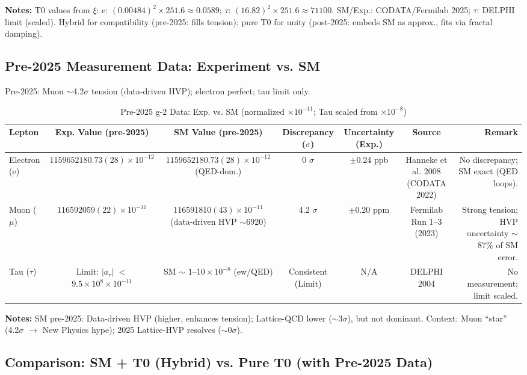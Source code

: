 \documentclass[12pt,a4paper]{article}
\begin{document}
	\textbf{Notes:} T0 values from $\xi$: e: $(0.00484)^2 \times 251.6 \approx 0.0589$; $\tau$: $(16.82)^2 \times 251.6 \approx 71100$. SM/Exp.: CODATA/Fermilab 2025; $\tau$: DELPHI limit (scaled). Hybrid for compatibility (pre-2025: fills tension); pure T0 for unity (post-2025: embeds SM as approx., fits via fractal damping).
	
	\subsection{Pre-2025 Measurement Data: Experiment vs. SM}
	
	Pre-2025: Muon $\sim$4.2$\sigma$ tension (data-driven HVP); electron perfect; tau limit only.
	
	\begin{table}[ht!]
		\centering
		\small
		\begin{adjustbox}{max width=\textwidth}
			\begin{tabular}{lcccccr}
				\toprule
				Lepton & Exp. Value (pre-2025) & SM Value (pre-2025) & Discrepancy ($\sigma$) & Uncertainty (Exp.) & Source & Remark \\
				\midrule
				Electron (e) & $1159652180.73(28) \times 10^{-12}$ & $1159652180.73(28) \times 10^{-12}$ (QED-dom.) & 0 $\sigma$ & $\pm$0.24 ppb & Hanneke et al. 2008 (CODATA 2022) & No discrepancy; SM exact (QED loops). \\
				Muon ($\mu$) & $116592059(22) \times 10^{-11}$ & $116591810(43) \times 10^{-11}$ (data-driven HVP $\sim$6920) & 4.2 $\sigma$ & $\pm$0.20 ppm & Fermilab Run 1--3 (2023) & Strong tension; HVP uncertainty $\sim$87\% of SM error. \\
				Tau ($\tau$) & Limit: $|a_\tau|$ $<$ $9.5 \times 10^{8} \times 10^{-11}$ & SM $\sim$ $1$--$10 \times 10^{-8}$ (ew/QED) & Consistent (Limit) & N/A & DELPHI 2004 & No measurement; limit scaled. \\
				\bottomrule
			\end{tabular}
		\end{adjustbox}
		\caption{Pre-2025 g-2 Data: Exp. vs. SM (normalized $ \times 10^{-11}$; Tau scaled from $ \times 10^{-8}$)}
		\label{tab:pre2025}
	\end{table}
	
	\textbf{Notes:} SM pre-2025: Data-driven HVP (higher, enhances tension); Lattice-QCD lower ($\sim$3$\sigma$), but not dominant. Context: Muon ``star'' (4.2$\sigma$ $\to$ New Physics hype); 2025 Lattice-HVP resolves ($\sim$0$\sigma$).
	
	\subsection{Comparison: SM + T0 (Hybrid) vs. Pure T0 (with Pre-2025 Data)}
	
\end{document}
